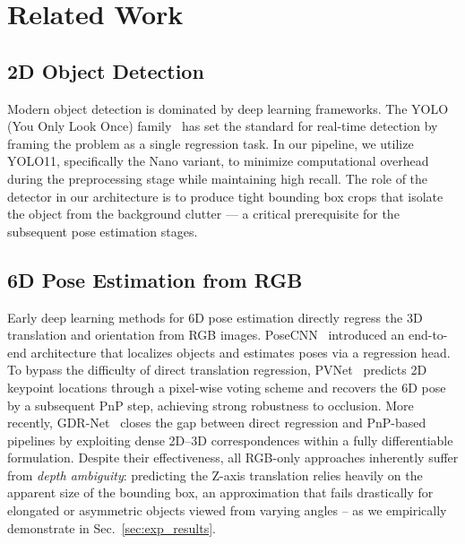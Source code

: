 \section{Related Work}
\label{sec:related}

\subsection{2D Object Detection}
\label{sec:related_detection}

Modern object detection is dominated by deep learning frameworks. The YOLO (You Only Look Once) family~\cite{ultralytics2024yolo11} has set the standard for real-time detection by framing the problem as a single regression task. In our pipeline, we utilize YOLO11, specifically the Nano variant, to minimize computational overhead during the preprocessing stage while maintaining high recall. The role of the detector in our architecture is to produce tight bounding box crops that isolate the object from the background clutter — a critical prerequisite for the subsequent pose estimation stages.

\subsection{6D Pose Estimation from RGB}
\label{sec:related_rgb_pose}

Early deep learning methods for 6D pose estimation directly regress the 3D translation and orientation from RGB images. PoseCNN~\cite{xiang2018posecnn} introduced an end-to-end architecture that localizes objects and estimates poses via a regression head. To bypass the difficulty of direct translation regression, PVNet~\cite{peng2019pvnet} predicts 2D keypoint locations through a pixel-wise voting scheme and recovers the 6D pose by a subsequent PnP step, achieving strong robustness to occlusion. More recently, GDR-Net~\cite{wang2021gdrnet} closes the gap between direct regression and PnP-based pipelines by exploiting dense 2D--3D correspondences within a fully differentiable formulation. Despite their effectiveness, all RGB-only approaches inherently suffer from \emph{depth ambiguity}: predicting the Z-axis translation relies heavily on the apparent size of the bounding box, an approximation that fails drastically for elongated or asymmetric objects viewed from varying angles -- as we empirically demonstrate in Sec.~\ref{sec:exp_results}.


